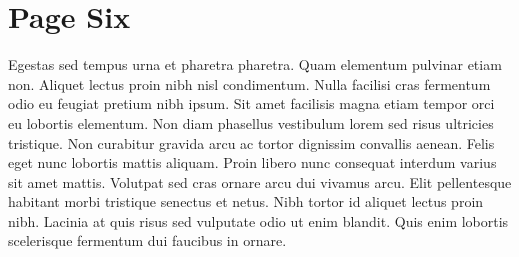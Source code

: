 \section{Page Six}

Egestas sed tempus urna et pharetra pharetra. Quam elementum pulvinar etiam non. Aliquet lectus proin nibh nisl condimentum. Nulla facilisi cras fermentum odio eu feugiat pretium nibh ipsum. Sit amet facilisis magna etiam tempor orci eu lobortis elementum. Non diam phasellus vestibulum lorem sed risus ultricies tristique. Non curabitur gravida arcu ac tortor dignissim convallis aenean. Felis eget nunc lobortis mattis aliquam. Proin libero nunc consequat interdum varius sit amet mattis. Volutpat sed cras ornare arcu dui vivamus arcu. Elit pellentesque habitant morbi tristique senectus et netus. Nibh tortor id aliquet lectus proin nibh. Lacinia at quis risus sed vulputate odio ut enim blandit. Quis enim lobortis scelerisque fermentum dui faucibus in ornare.